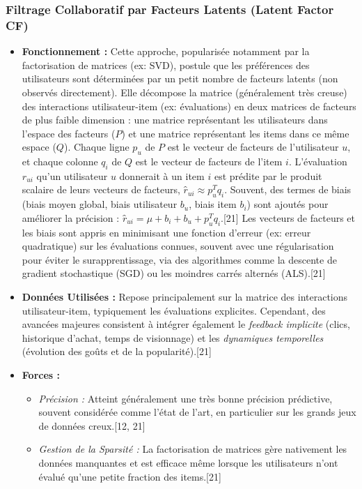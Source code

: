 \documentclass[11pt,a4paper]{article}
\begin{document}
\subsubsection{Filtrage Collaboratif par Facteurs Latents (Latent Factor CF)}
\begin{itemize}
    \item \textbf{Fonctionnement :} Cette approche, popularisée notamment par la factorisation de matrices (ex: SVD), postule que les préférences des utilisateurs sont déterminées par un petit nombre de facteurs latents (non observés directement). Elle décompose la matrice (généralement très creuse) des interactions utilisateur-item (ex: évaluations) en deux matrices de facteurs de plus faible dimension : une matrice représentant les utilisateurs dans l'espace des facteurs ($P$) et une matrice représentant les items dans ce même espace ($Q$). Chaque ligne $p_u$ de $P$ est le vecteur de facteurs de l'utilisateur $u$, et chaque colonne $q_i$ de $Q$ est le vecteur de facteurs de l'item $i$. L'évaluation $r_{ui}$ qu'un utilisateur $u$ donnerait à un item $i$ est prédite par le produit scalaire de leurs vecteurs de facteurs, $r̂_{ui} \approx p_u^T q_i$. Souvent, des termes de biais (biais moyen global, biais utilisateur $b_u$, biais item $b_i$) sont ajoutés pour améliorer la précision : $r̂_{ui} = \mu + b_i + b_u + p_u^T q_i$.[21] Les vecteurs de facteurs et les biais sont appris en minimisant une fonction d'erreur (ex: erreur quadratique) sur les évaluations connues, souvent avec une régularisation pour éviter le surapprentissage, via des algorithmes comme la descente de gradient stochastique (SGD) ou les moindres carrés alternés (ALS).[21]
    \item \textbf{Données Utilisées :} Repose principalement sur la matrice des interactions utilisateur-item, typiquement les évaluations explicites. Cependant, des avancées majeures consistent à intégrer également le \textit{feedback implicite} (clics, historique d'achat, temps de visionnage) et les \textit{dynamiques temporelles} (évolution des goûts et de la popularité).[21]
    \item \textbf{Forces :}
        \begin{itemize}
            \item \textit{Précision :} Atteint généralement une très bonne précision prédictive, souvent considérée comme l'état de l'art, en particulier sur les grands jeux de données creux.[12, 21]
            \item \textit{Gestion de la Sparsité :} La factorisation de matrices gère nativement les données manquantes et est efficace même lorsque les utilisateurs n'ont évalué qu'une petite fraction des items.[21]

\end{itemize}
\end{itemize}
\end{document}
